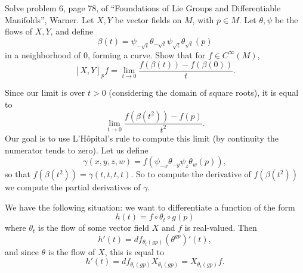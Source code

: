 \def\bK{{\bb K}}

\bprob

    Solve problem 6, page 78, of ``Foundations of Lie Groups and Differentiable Manifolds'', Warner.
    Let $X,Y$ be vector fields on $M$, with $p\in M$.
    Let $\theta,\psi$ be the flows of $X,Y$, and define
    $$ \beta(t) = \psi_{-\sqrt t}\theta_{-\sqrt t}\psi_{\sqrt t}\theta_{\sqrt t}(p) $$
    in a neighborhood of $0$, forming a curve.
    Show that for $f\in C^\infty(M)$,
    $$ [X,Y]_pf = \lim_{t\to0}\frac{f(\beta(t)) - f(\beta(0))}t . $$

\eprob

Since our limit is over $t>0$ (considering the domain of square roots), it is equal to
$$ \lim_{t\to0}\frac{f(\beta(t^2)) - f(p)}{t^2} . $$
Our goal is to use L'H\^opital's rule to compute this limit (by continuity the numerator tends to zero).
Let us define
$$ \gamma(x,y,z,w) = f(\psi_{-x}\theta_{-y}\psi_z\theta_w(p)), $$
so that $f(\beta(t^2))=\gamma(t,t,t,t)$.
So to compute the derivative of $f(\beta(t^2))$ we compute the partial derivatives of $\gamma$.

We have the following situation: we want to differentiate a function of the form
$$ h(t) = f\circ\theta_t\circ g(p) $$
where $\theta_t$ is the flow of some vector field $X$ and $f$ is real-valued.
Then
$$ h'(t) = df_{\theta_t(gp)}(\theta^{gp})'(t) , $$
and since $\theta$ is the flow of $X$, this is equal to
$$ h'(t) = df_{\theta_t(gp)}X_{\theta_t(gp)} = X_{\theta_t(gp)}f . $$

